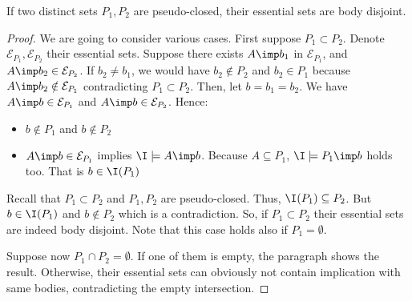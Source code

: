 \begin{proposition} \label{prop:let.imp_pc_bd}
If two distinct sets $P_1, P_2$ are pseudo-closed, their essential 
sets are body disjoint. 
	
\end{proposition}

\begin{proof} We are going to consider various cases. First suppose $P_1 
\subset P_2$. Denote $\mathcal{E}_{P_1}, \mathcal{E}_{P_2}$ their essential 
sets. Suppose there exists $A \imp b_1$ in $\mathcal{E}_{P_1}$, and $A \imp b_2 
\in \mathcal{E}_{P_2}$. If $b_2 \neq b_1$, we would have $b_2 \notin P_2$ and 
$b_2 \in P_1$ because $A \imp b_2 \notin \mathcal{E}_{P_1}$ contradicting $P_1 
\subset P_2$. Then, let $b = b_1 = b_2$. We have $A \imp b \in 
\mathcal{E}_{P_1}$ and $A \imp b \in \mathcal{E}_{P_2}$. Hence:
\begin{itemize}
	\item $b \notin P_1$ and $b \notin P_2$
	\item $A \imp b \in \mathcal{E}_{P_1}$ implies $\I \models A \imp b$. 
	Because 
	$A 
	\subseteq P_1$, $\I \models P_1 \imp b$ holds too. That is $b \in \I(P_1)$
\end{itemize}
\noindent Recall that $P_1 \subset P_2$ and $P_1, P_2$ are pseudo-closed. Thus,
$\I(P_1) \subseteq P_2$. But $b \in \I(P_1)$ and $b \notin P_2$ which is a 
contradiction. So, if $P_1 \subset P_2$ their essential sets are indeed body
disjoint. Note that this case holds also if $P_1 = \emptyset$.

\vspace{1.2em}

Suppose now $P_1 \cap P_2 = \emptyset$. If one of them is empty, the paragraph 
shows the result. Otherwise, their essential sets can obviously not contain 
implication with same bodies, contradicting the empty intersection. 

\vspace{1.2em}


\end{proof}
